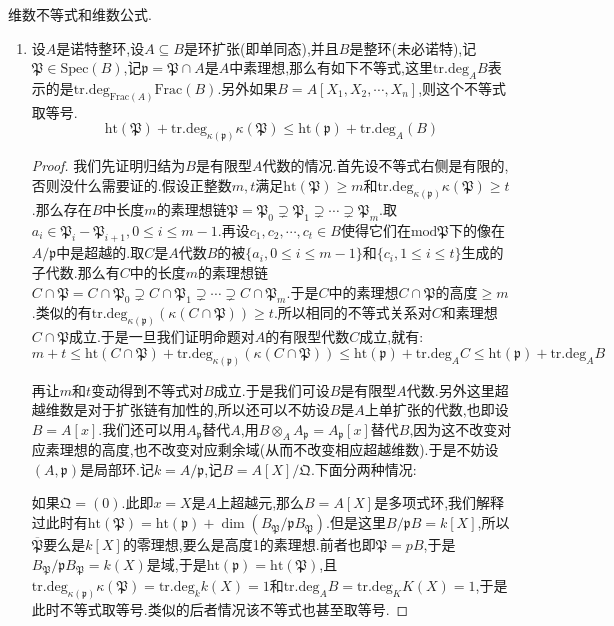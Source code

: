 维数不等式和维数公式.
\begin{enumerate}
	\item 设$A$是诺特整环,设$A\subseteq B$是环扩张(即单同态),并且$B$是整环(未必诺特),记$\mathfrak{P}\in\mathrm{Spec}(B)$,记$\mathfrak{p}=\mathfrak{P}\cap A$是$A$中素理想,那么有如下不等式,这里$\mathrm{tr.deg}_AB$表示的是$\mathrm{tr.deg}_{\mathrm{Frac}(A)}\mathrm{Frac}(B)$.另外如果$B=A[X_1,X_2,\cdots,X_n]$,则这个不等式取等号.
	$$\mathrm{ht}(\mathfrak{P})+\mathrm{tr.deg}_{\kappa(\mathfrak{p})}\kappa(\mathfrak{P})\le\mathrm{ht}(\mathfrak{p})+\mathrm{tr.deg}_A(B)$$
	\begin{proof}
		
		我们先证明归结为$B$是有限型$A$代数的情况.首先设不等式右侧是有限的,否则没什么需要证的.假设正整数$m,t$满足$\mathrm{ht}(\mathfrak{P})\ge m$和$\mathrm{tr.deg}_{\kappa(\mathfrak{p})}\kappa(\mathfrak{P})\ge t$.那么存在$B$中长度$m$的素理想链$\mathfrak{P}=\mathfrak{P}_0\supsetneq\mathfrak{P}_1\supsetneq\cdots\supsetneq\mathfrak{P}_m$.取$a_i\in\mathfrak{P}_i-\mathfrak{P}_{i+1},0\le i\le m-1$.再设$c_1,c_2,\cdots,c_t\in B$使得它们在$\mathrm{mod}\mathfrak{P}$下的像在$A/\mathfrak{p}$中是超越的.取$C$是$A$代数$B$的被$\{a_i,0\le i\le m-1\}$和$\{c_i,1\le i\le t\}$生成的子代数.那么有$C$中的长度$m$的素理想链$C\cap\mathfrak{P}=C\cap\mathfrak{P}_0\supsetneq C\cap\mathfrak{P}_1\supsetneq\cdots\supsetneq C\cap\mathfrak{P}_m$.于是$C$中的素理想$C\cap\mathfrak{P}$的高度$\ge m$.类似的有$\mathrm{tr.deg}_{\kappa(\mathfrak{p})}(\kappa(C\cap\mathfrak{P}))\ge t$.所以相同的不等式关系对$C$和素理想$C\cap\mathfrak{P}$成立.于是一旦我们证明命题对$A$的有限型代数$C$成立,就有:
		$$m+t\le\mathrm{ht}(C\cap\mathfrak{P})+\mathrm{tr.deg}_{\kappa(\mathfrak{p})}(\kappa(C\cap\mathfrak{P}))\le\mathrm{ht}(\mathfrak{p})+\mathrm{tr.deg}_AC\le\mathrm{ht}(\mathfrak{p})+\mathrm{tr.deg}_AB$$
		
		再让$m$和$t$变动得到不等式对$B$成立.于是我们可设$B$是有限型$A$代数.另外这里超越维数是对于扩张链有加性的,所以还可以不妨设$B$是$A$上单扩张的代数,也即设$B=A[x]$.我们还可以用$A_{\mathfrak{p}}$替代$A$,用$B\otimes_AA_{\mathfrak{p}}=A_{\mathfrak{p}}[x]$替代$B$,因为这不改变对应素理想的高度,也不改变对应剩余域(从而不改变相应超越维数).于是不妨设$(A,\mathfrak{p})$是局部环.记$k=A/\mathfrak{p}$,记$B=A[X]/\mathfrak{Q}$.下面分两种情况:
		
		\qquad
		
		如果$\mathfrak{Q}=(0)$.此即$x=X$是$A$上超越元,那么$B=A[X]$是多项式环,我们解释过此时有$\mathrm{ht}(\mathfrak{P})=\mathrm{ht}(\mathfrak{p})+\dim(B_{\mathfrak{P}}/\mathfrak{p}B_{\mathfrak{P}})$.但是这里$B/\mathfrak{p}B=k[X]$,所以$\overline{\mathfrak{P}}$要么是$k[X]$的零理想,要么是高度1的素理想.前者也即$\mathfrak{P}=pB$,于是$B_{\mathfrak{P}}/\mathfrak{p}B_{\mathfrak{P}}=k(X)$是域,于是$\mathrm{ht}(\mathfrak{p})=\mathrm{ht}(\mathfrak{P})$,且$\mathrm{tr.deg}_{\kappa(\mathfrak{p})}\kappa(\mathfrak{P})=\mathrm{tr.deg}_kk(X)=1$和$\mathrm{tr.deg}_AB=\mathrm{tr.deg}_KK(X)=1$,于是此时不等式取等号.类似的后者情况该不等式也甚至取等号.
		

\end{proof}
\end{enumerate}
